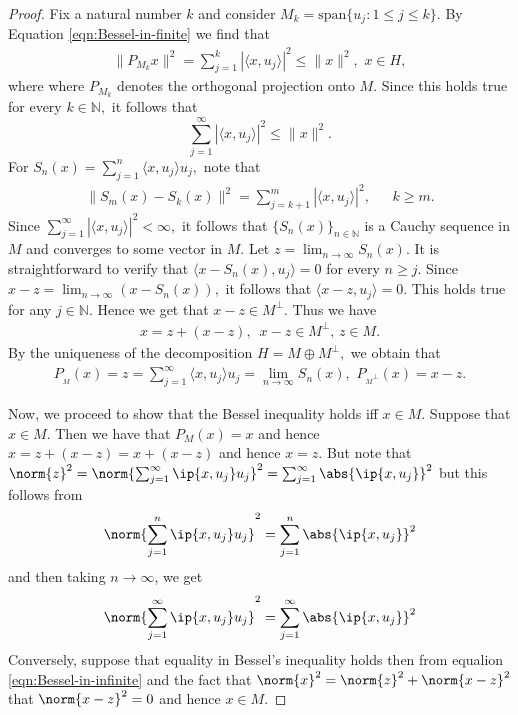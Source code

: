 \begin{proof}
    Fix a natural number $k$ and consider $M_k= \text{span} \{u_j: 1\leqslant j \leqslant k\}.$ By Equation \ref{eqn:Bessel-in-finite} we find that 
\begin{align*}
\|P_{M_k}x\|^2 = \sum_{j=1}^k |\langle x, u_j\rangle|^2 \leqslant \|x\|^2,\,\,x\in H,
\end{align*}
where where $P_{M_k}$ denotes the orthogonal projection onto $M.$ Since this holds true for every $k\in \mathbb N,$ it follows that
$$ \sum_{j=1}^{\infty} |\langle x, u_j\rangle|^2 \leqslant \|x\|^2.$$ 
For $S_n(x) = \sum_{j=1}^{n} \langle x, u_j\rangle u_j ,$  note that 
\begin{align*}
\|S_m(x) - S_k(x)\|^2= \sum_{j=k+1}^m |\langle x, u_j\rangle|^2,\,\, \,\,~~~~k\geqslant m.
\end{align*}
Since $\sum_{j=1}^{\infty} |\langle x, u_j\rangle|^2 < \infty ,$ it follows that $\{S_n(x)\}_{n\in\mathbb N}$ is a Cauchy sequence in $M$ and converges to some vector in $M.$ Let $z= \lim_{n\to\infty} S_n(x).$ It is straightforward to verify that $\langle x-S_n(x), u_j\rangle = 0$ for every $n\geqslant j.$ Since $x-z= \lim_{n\to\infty} (x-S_n(x)),$ it follows that $\langle x-z,u_j\rangle =0.$ This holds true for any $j\in \mathbb N.$ Hence 
we get that $x-z\in M^{\perp}.$ Thus we have
\begin{align*}
x= z+ (x-z) ,\,\,\,x-z\in M^{\perp},\,z\in M.
\end{align*}
By the uniqueness of the decomposition $H= M \oplus M^{\perp},$ we obtain that 
\begin{align*}
P_{_M}(x)= z= \sum_{j=1}^{\infty} \langle x, u_j\rangle u_j = \lim_{n\to\infty} S_n(x),\,\, P_{{_M}^{\perp}}(x)=x-z.
\end{align*}

Now, we proceed to show that the Bessel inequality holds iff $x\in M$. Suppose that $x\in M$. Then we have that $P_{M} \left( x \right) = x$ and hence $x = z + (x-z) = x + (x-z)$ and hence $x=z$. But note that $\norm{z} ^{2} = \norm{\sum_{j=1}^{\infty}\ip{x, u_{j}} u_{j}}^2 = \sum_{j=1}^{\infty} \abs{\ip{x,u_{j}}}^2$ but this follows from 
\begin{align*}
    \norm{\sum_{j=1}^{n}\ip{x, u_{j}} u_{j}}^2 = \sum_{j=1}^{n} \abs{\ip{x,u_{j}}}^2
\end{align*} and then taking $n\to \infty$, we get
\begin{align}
  \norm{\sum_{j=1}^{\infty}\ip{x, u_{j}} u_{j}}^2 = \sum_{j=1}^{\infty} \abs{\ip{x,u_{j}}}^2  \label{eqn:Bessel-in-infinite}
\end{align}
Conversely, suppose that equality in Bessel's inequality holds then from equalion \ref{eqn:Bessel-in-infinite} and the fact that $\norm{x} ^{2} = \norm{z} ^{2} + \norm{x-z} ^{2}$ that $\norm{x-z} ^{2} = 0$ and hence $x\in M$.
\end{proof}


